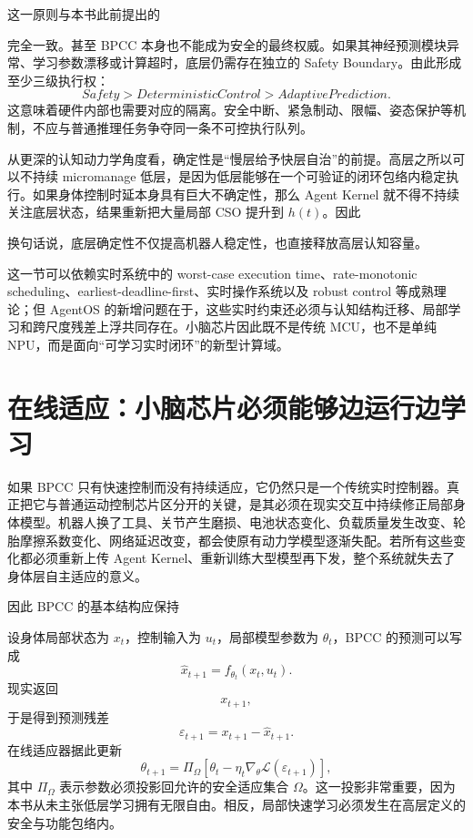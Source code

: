 这一原则与本书此前提出的
\begin{statementbox}
\centering
{}
\end{statementbox}
完全一致。甚至 BPCC 本身也不能成为安全的最终权威。如果其神经预测模块异常、学习参数漂移或计算超时，底层仍需存在独立的 Safety Boundary。由此形成至少三级执行权：
\[
Safety
>
DeterministicControl
>
AdaptivePrediction.
\]
这意味着硬件内部也需要对应的隔离。安全中断、紧急制动、限幅、姿态保护等机制，不应与普通推理任务争夺同一条不可控执行队列。

从更深的认知动力学角度看，确定性是“慢层给予快层自治”的前提。高层之所以可以不持续 micromanage 低层，是因为低层能够在一个可验证的闭环包络内稳定执行。如果身体控制时延本身具有巨大不确定性，那么 Agent Kernel 就不得不持续关注底层状态，结果重新把大量局部 CSO 提升到 $h(t)$。因此
\begin{statementbox}
\centering
{}
\end{statementbox}
换句话说，底层确定性不仅提高机器人稳定性，也直接释放高层认知容量。

这一节可以依赖实时系统中的 worst-case execution time、rate-monotonic scheduling、earliest-deadline-first、实时操作系统以及 robust control 等成熟理论；但 AgentOS 的新增问题在于，这些实时约束还必须与认知结构迁移、局部学习和跨尺度残差上浮共同存在。小脑芯片因此既不是传统 MCU，也不是单纯 NPU，而是面向“可学习实时闭环”的新型计算域。

\section{在线适应：小脑芯片必须能够边运行边学习}

如果 BPCC 只有快速控制而没有持续适应，它仍然只是一个传统实时控制器。真正把它与普通运动控制芯片区分开的关键，是其必须在现实交互中持续修正局部身体模型。机器人换了工具、关节产生磨损、电池状态变化、负载质量发生改变、轮胎摩擦系数变化、网络延迟改变，都会使原有动力学模型逐渐失配。若所有这些变化都必须重新上传 Agent Kernel、重新训练大型模型再下发，整个系统就失去了身体层自主适应的意义。

因此 BPCC 的基本结构应保持
\begin{statementbox}
\centering
{}
\end{statementbox}
设身体局部状态为 $x_t$，控制输入为 $u_t$，局部模型参数为 $\theta_t$，BPCC 的预测可以写成
\[
\hat x_{t+1}
=
f_{\theta_t}(x_t,u_t).
\]
现实返回
\[
x_{t+1},
\]
于是得到预测残差
\[
\varepsilon_{t+1}
=
x_{t+1}
-
\hat x_{t+1}.
\]
在线适应器据此更新
\[
\theta_{t+1}
=
\Pi_{\Omega}
\left[
\theta_t
-
\eta_t
\nabla_{\theta}
\mathcal L(\varepsilon_{t+1})
\right],
\]
其中 $\Pi_{\Omega}$ 表示参数必须投影回允许的安全适应集合 $\Omega$。这一投影非常重要，因为本书从未主张低层学习拥有无限自由。相反，局部快速学习必须发生在高层定义的安全与功能包络内。

